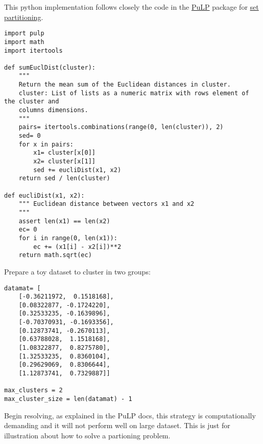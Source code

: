 \documentclass[a4paper]{article}
\begin{document}
This python implementation follows closely the code in the \href{http://pythonhosted.org/PuLP/index.html}{PuLP} package for
\href{http://pythonhosted.org/PuLP/CaseStudies/a_set_partitioning_problem.html}{set partitioning}.

\begin{verbatim}
import pulp
import math
import itertools

def sumEuclDist(cluster):
    """
    Return the mean sum of the Euclidean distances in cluster.
    cluster: List of lists as a numeric matrix with rows element of the cluster and
    columns dimensions.
    """
    pairs= itertools.combinations(range(0, len(cluster)), 2)
    sed= 0
    for x in pairs:
        x1= cluster[x[0]]
        x2= cluster[x[1]]
        sed += eucliDist(x1, x2)
    return sed / len(cluster)

def eucliDist(x1, x2):
    """ Euclidean distance between vectors x1 and x2
    """
    assert len(x1) == len(x2)
    ec= 0
    for i in range(0, len(x1)):
        ec += (x1[i] - x2[i])**2
    return math.sqrt(ec)
\end{verbatim}

Prepare a toy dataset to cluster in two groups:

\begin{verbatim}
datamat= [
    [-0.36211972,  0.1518168],
    [0.08322877, -0.1724220],
    [0.32533235, -0.1639896],
    [-0.70370931, -0.1693356],
    [0.12873741, -0.2670113],
    [0.63788028,  1.1518168],
    [1.08322877,  0.8275780],
    [1.32533235,  0.8360104],
    [0.29629069,  0.8306644],
    [1.12873741,  0.7329887]]

max_clusters = 2
max_cluster_size = len(datamat) - 1
\end{verbatim}

Begin resolving, as explained in the PuLP docs, this strategy is computationally
demanding and it will not perform well on large dataset. This is just for
illustration about how to solve a partioning problem.
\end{document}

